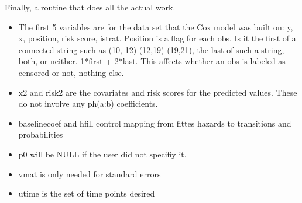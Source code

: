 \documentclass{article}
\begin{document}
Finally, a routine that does all the actual work.
\begin{itemize}
  \item The first 5 variables are for the data set that the Cox model was built 
    on: y, x, position, risk score, istrat.  
    Position is a flag for each obs. Is it the first of a connected string
    such as (10, 12) (12,19) (19,21), the last of such a string, both, 
    or neither.  1*first + 2*last.   This affects whether an obs is labeled
    as censored or not, nothing else.
  \item x2 and risk2 are the covariates and risk scores for the predicted 
    values.  These do not involve any ph(a:b) coefficients.
  \item baselinecoef and hfill control mapping from fittes hazards to 
    transitions and probabilities
  \item p0 will be NULL if the user did not specifiy it.  
  \item vmat is only needed for standard errors
  \item utime is the set of time points desired
\end{itemize}
\end{document}
